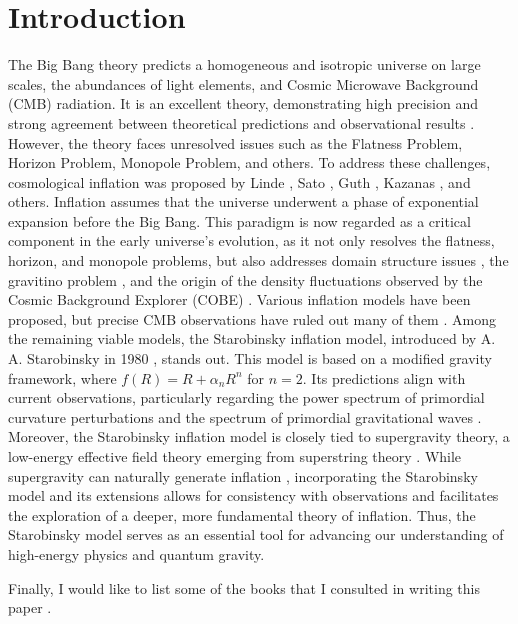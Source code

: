 \documentclass[12pt]{article}
\numberwithin{equation}{section}
\begin{document}
\section{Introduction}
 The Big Bang theory predicts a homogeneous and isotropic universe on large scales, the abundances of light elements, and Cosmic Microwave Background (CMB) radiation. It is an excellent theory, demonstrating high precision and strong agreement between theoretical predictions and observational results \cite{Planck:2018vyg}\cite{BICEP:2021xfz}\cite{Cyburt:2015mya}. However, the theory faces unresolved issues such as the Flatness Problem, Horizon Problem, Monopole Problem, and others. To address these challenges, cosmological inflation was proposed by Linde \cite{Linde:1981mu}, Sato \cite{Sato:1980yn}, Guth \cite{Guth:1980zm}, Kazanas \cite{Kazanas:1980tx}, and others. Inflation assumes that the universe underwent a phase of exponential expansion before the Big Bang. This paradigm is now regarded as a critical component in the early universe's evolution, as it not only resolves the flatness, horizon, and monopole problems, but also addresses domain structure issues \cite{SATO198166}, the gravitino problem \cite{Weinberg:1982zq}, and the origin of the density fluctuations \cite{Hawking:1982cz} observed by the Cosmic Background Explorer (COBE) \cite{COBE:1992syq}. Various inflation models have been proposed, but precise CMB observations have ruled out many of them \cite{Martin:2013tda}. Among the remaining viable models, the Starobinsky inflation model, introduced by A. A. Starobinsky in 1980 \cite{Starobinsky:1980te}, stands out. This model is based on a modified gravity framework, where $f(R) = R + \alpha_{n}R^n$ for $n=2$. Its predictions align with current observations, particularly regarding the power spectrum of primordial curvature perturbations and the spectrum of primordial gravitational waves \cite{Alam:2024kgk}\cite{German:2023euc}. Moreover, the Starobinsky inflation model is closely tied to supergravity theory, a low-energy effective field theory emerging from superstring theory \cite{Ketov2024}. While supergravity can naturally generate inflation \cite{Kallosh:2010ug}, incorporating the Starobinsky model and its extensions allows for consistency with observations and facilitates the exploration of a deeper, more fundamental theory of inflation. Thus, the Starobinsky model serves as an essential tool for advancing our understanding of high-energy physics and quantum gravity.\par
 Finally, I would like to list some of the books that I consulted in writing this paper \cite{matsubara_cos1}\cite{matsubara_cos2}\cite{matsubara_base}\cite{tsujikawa_cos}\cite{Weinberg_cos}.
\end{document}
